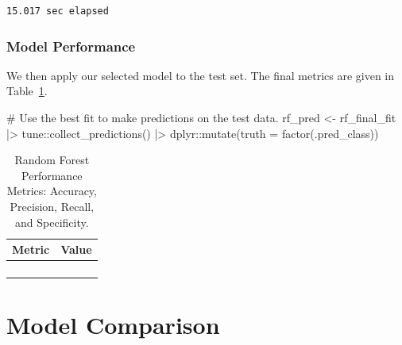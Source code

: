 \documentclass[
  letterpaper,
  DIV=11,
  numbers=noendperiod]{scrartcl}
\newenvironment{Shaded}{\begin{snugshade}}{\end{snugshade}}
\newcommand{\AttributeTok}[1]{\textcolor[rgb]{0.40,0.45,0.13}{#1}}
\newcommand{\CommentTok}[1]{\textcolor[rgb]{0.37,0.37,0.37}{#1}}
\newcommand{\FunctionTok}[1]{\textcolor[rgb]{0.28,0.35,0.67}{#1}}
\newcommand{\NormalTok}[1]{\textcolor[rgb]{0.00,0.23,0.31}{#1}}
\newcommand{\OtherTok}[1]{\textcolor[rgb]{0.00,0.23,0.31}{#1}}
\newcommand{\SpecialCharTok}[1]{\textcolor[rgb]{0.37,0.37,0.37}{#1}}
\begin{document}
\begin{verbatim}
15.017 sec elapsed
\end{verbatim}

\subsubsection{Model Performance}\label{model-performance-5}

We then apply our selected model to the test set. The final metrics are
given in Table~\ref{tbl-rf-performance}.

\begin{Shaded}
\begin{Highlighting}[]
\CommentTok{\# Use the best fit to make predictions on the test data.}
\NormalTok{rf\_pred }\OtherTok{\textless{}{-}} 
\NormalTok{  rf\_final\_fit }\SpecialCharTok{|\textgreater{}} 
\NormalTok{  tune}\SpecialCharTok{::}\FunctionTok{collect\_predictions}\NormalTok{() }\SpecialCharTok{|\textgreater{}}
\NormalTok{  dplyr}\SpecialCharTok{::}\FunctionTok{mutate}\NormalTok{(}\AttributeTok{truth =} \FunctionTok{factor}\NormalTok{(.pred\_class))}
\end{Highlighting}
\end{Shaded}

\begin{longtable}{>{\raggedright\arraybackslash}p{}>{\raggedleft\arraybackslash}p{}}

\caption{\label{tbl-rf-performance}Random Forest Performance Metrics:
Accuracy, Precision, Recall, and Specificity.}

\tabularnewline

\toprule
Metric & Value \\ 
\midrule\addlinespace[2.5pt]
\cellcolor[HTML]{FFFFFF}{Accuracy} & \cellcolor[HTML]{FFFFFF}{94.5} \\ 
\cellcolor[HTML]{FFFFFF}{Precision} & \cellcolor[HTML]{FFFFFF}{84.6} \\ 
\cellcolor[HTML]{FFFFFF}{Recall} & \cellcolor[HTML]{FFFFFF}{95.7} \\ 
\cellcolor[HTML]{FFFFFF}{Specificity} & \cellcolor[HTML]{FFFFFF}{94.1} \\ 
\bottomrule

\end{longtable}

\section{Model Comparison}\label{model-comparison}
\end{document}
